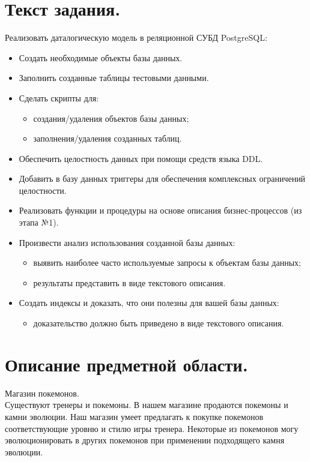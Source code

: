 \documentclass[12pt,onecolumn]{article}
\begin{document}
\section{Текст задания.}
Реализовать даталогическую модель в реляционной СУБД PostgreSQL: 
\begin{itemize}
  \item Создать необходимые объекты базы данных.
  \item Заполнить созданные таблицы тестовыми данными.
  \item Сделать скрипты для: \begin{itemize}
    \item создания/удаления объектов базы данных;
    \item заполнения/удаления созданных таблиц.
  \end{itemize}
  \item Обеспечить целостность данных при помощи средств языка DDL.
  \item Добавить в базу данных триггеры для обеспечения комплексных ограничений
  целостности.
  \item Реализовать функции и процедуры на основе описания бизнес-процессов (из этапа
  №1).
  \item Произвести анализ использования созданной базы данных: \begin{itemize}
    \item выявить наиболее часто используемые запросы к объектам базы данных;
    \item результаты представить в виде текстового описания. 
  \end{itemize}
  \item Создать индексы и доказать, что они полезны для вашей базы данных: \begin{itemize}
    \item доказательство должно быть приведено в виде текстового описания.
  \end{itemize}
\end{itemize}
\section{Описание предметной области.}
Магазин покемонов.\\
Существуют тренеры и покемоны. В нашем магазине продаются покемоны и камни эволюции. Наш магазин умеет предлагать к покупке покемонов соответствующие уровню и стилю игры тренера. Некоторые из покемонов могу эволюционировать в других покемонов при применении подходящего камня эволюции. 
\end{document}
